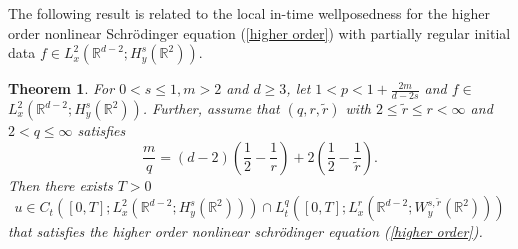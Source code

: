 \documentclass[a4paper,11pt, reqno]{amsart}
\newtheorem{theorem}{Theorem}[section]
\theoremstyle{definition}
\theoremstyle{remark}
\numberwithin{equation}{section}
\begin{document}
	
	The following result is  related to the local in-time wellposedness  for the higher order nonlinear Schrödinger equation (\ref{higher order}) with partially regular initial data $f \in L_x^2\left(\mathbb{R}^{d-2} ; H_y^s\left(\mathbb{R}^2\right)\right)$. 
	\begin{theorem}
		For   $0<s \leq 1, m>2$ and $d \geq 3$,  let   $1<p<1+\frac{2m}{ d-2s}$ and $f \in$ $L_x^2\left(\mathbb{R}^{d-2} ; H_y^s\left(\mathbb{R}^2\right)\right)$.  Further, assume that  
		$(q, r, \tilde{r})$ with $2 \leq \widetilde{r} \leq r<\infty$ and $ 2<q \leq \infty $ satisfies $$			\frac{{{m}}}{q}=(d-2)\left(\frac{1}{2}-\frac{1}{r}\right)+2\left(\frac{1}{2}-\frac{1}{\widetilde{r}}\right).$$ Then there exists  $T>0$ 
		$$
		u \in C_t\left([0, T] ; L_x^2\left(\mathbb{R}^{d-2}; H_y^s(\mathbb{R}^{2})\right)\right) \cap   L_t^q\left([0, T] ; L_x^r \left(\mathbb{R}^{d-2}; W_y^{s, \widetilde{r}}(\mathbb{R}^{2})\right)\right)
		$$
		that satisfies  the higher order nonlinear schr\"odinger equation  (\ref{higher order}).
	\end{theorem}
\end{document}

